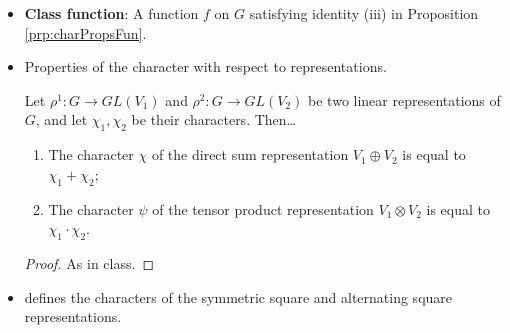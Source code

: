 \documentclass[../notes.tex]{subfiles}
\begin{document}
\begin{itemize}
\begin{proposition}
\begin{proof}
            \begin{equation*}
                \chi(tst^{-1}) = \tr(\rho_{tst^{-1}})
                = \tr(\rho_t\rho_s\rho_{t^{-1}})
                = \tr(uv)
                = \tr(vu)
                = \tr(\rho_{t^{-1}}\rho_t\rho_s)
                = \tr(\rho_s)
                = \chi(s)
            \end{equation*}
        \end{proof}
    \end{proposition}
    \item \textbf{Class function}: A function $f$ on $G$ satisfying identity (iii) in Proposition \ref{prp:charPropsFun}.
    \item Properties of the character with respect to representations.
    \begin{proposition}\label{prp:charPropsSumProd}
        Let $\rho^1:G\to GL(V_1)$ and $\rho^2:G\to GL(V_2)$ be two linear representations of $G$, and let $\chi_1,\chi_2$ be their characters. Then\dots
        \begin{enumerate}[label={\textup{(\roman*)}}]
            \item The character $\chi$ of the direct sum representation $V_1\oplus V_2$ is equal to $\chi_1+\chi_2$;
            \item The character $\psi$ of the tensor product representation $V_1\otimes V_2$ is equal to $\chi_1\cdot\chi_2$.
        \end{enumerate}
        \begin{proof}
            As in class.
        \end{proof}
    \end{proposition}
    \item \textcite{bib:Serre} defines the characters of the symmetric square and alternating square representations.
\end{itemize}
\end{document}
